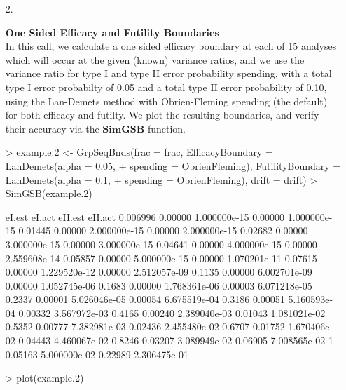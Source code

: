 \documentclass{article}
\begin{document}
\begin{itemize}
  \item[2.]{{\bf One Sided Efficacy and Futility Boundaries}\\
    In this call, we calculate a one sided efficacy boundary at each of 15 analyses which will
    occur at the given (known) variance ratios, and we use the variance ratio for type I and
    type II error probability spending, with a total type I error probabilty of 0.05 and a total
    type II error probability of 0.10, using the Lan-Demets method with Obrien-Fleming spending
    (the default) for both efficacy and futilty. We plot the resulting boundaries, and verify
    their accuracy via the $\mathbf{SimGSB}$ function.

\begin{Schunk}
\begin{Sinput}
> example.2 <- GrpSeqBnds(frac = frac, EfficacyBoundary = LanDemets(alpha = 0.05, 
+     spending = ObrienFleming), FutilityBoundary = LanDemets(alpha = 0.1, 
+     spending = ObrienFleming), drift = drift)
> SimGSB(example.2)
\end{Sinput}
\begin{Soutput}
          eI.est       eI.act eII.est      eII.act
0.006996 0.00000 1.000000e-15 0.00000 1.000000e-15
0.01445  0.00000 2.000000e-15 0.00000 2.000000e-15
0.02682  0.00000 3.000000e-15 0.00000 3.000000e-15
0.04641  0.00000 4.000000e-15 0.00000 2.559608e-14
0.05857  0.00000 5.000000e-15 0.00000 1.070201e-11
0.07615  0.00000 1.229520e-12 0.00000 2.512057e-09
0.1135   0.00000 6.002701e-09 0.00000 1.052745e-06
0.1683   0.00000 1.768361e-06 0.00003 6.071218e-05
0.2337   0.00001 5.026046e-05 0.00054 6.675519e-04
0.3186   0.00051 5.160593e-04 0.00332 3.567972e-03
0.4165   0.00240 2.389040e-03 0.01043 1.081021e-02
0.5352   0.00777 7.382981e-03 0.02436 2.455480e-02
0.6707   0.01752 1.670406e-02 0.04443 4.460067e-02
0.8246   0.03207 3.089949e-02 0.06905 7.008565e-02
1        0.05163 5.000000e-02 0.22989 2.306475e-01
\end{Soutput}
\end{Schunk}

\begin{Schunk}
\begin{Sinput}
> plot(example.2)
\end{Sinput}
\end{Schunk}
  }


\end{itemize}
\end{document}
